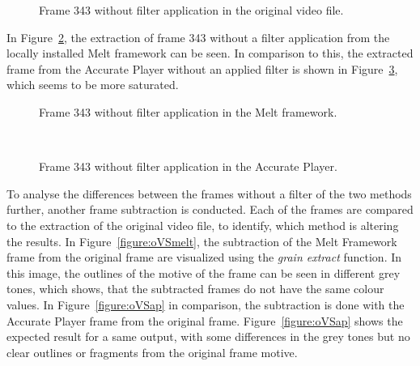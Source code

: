 \documentclass[../MasterThesis.tex]{subfiles}
\begin{document}
\begin{figure}[H]
	\begin{center}
		\caption[Frame 343 without filter application in the original video file.]{Frame 343 without filter application in the original video file.}
		\label{figure:nofilterO}
	\end{center}
\end{figure}


In Figure~\ref{figure:nofilterMelt}, the extraction of frame 343 without a filter application from the locally installed Melt framework can be seen. In comparison to this, the extracted frame from the Accurate Player without an applied filter is shown in Figure~\ref{figure:nofilterAP}, which seems to be more saturated.


\begin{minipage}{0.48\textwidth}
	\begin{figure}[H]
		\begin{center}
			\caption[Frame 343 without filter application in the Melt framework.]{Frame 343 without filter application in the Melt framework.}
			\label{figure:nofilterMelt}
		\end{center}
	\end{figure}
\end{minipage}\begin{minipage}{0.04\textwidth}
	\ 
\end{minipage}\begin{minipage}{0.48\textwidth}
	\begin{figure}[H]
		\begin{center}
			\caption[Frame 343 without filter application in the Accurate Player.]{Frame 343 without filter application in the Accurate Player.}
			\label{figure:nofilterAP}
		\end{center}
	\end{figure}
\end{minipage}

\vspace*{1.5em}
To analyse the differences between the frames without a filter of the two methods further, another frame subtraction is conducted. Each of the frames are compared to the extraction of the original video file, to identify, which method is altering the results.
In Figure~\ref{figure:oVSmelt}, the subtraction of the Melt Framework frame from the original frame are visualized using the \textit{grain extract} function. In this image, the outlines of the motive of the frame can be seen in different grey tones, which shows, that the subtracted frames do not have the same colour values.
In Figure~\ref{figure:oVSap} in comparison, the subtraction is done with the Accurate Player frame from the original frame. Figure~\ref{figure:oVSap} shows the expected result for a same output, with some differences in the grey tones but no clear outlines or fragments from the original frame motive.
\end{document}
